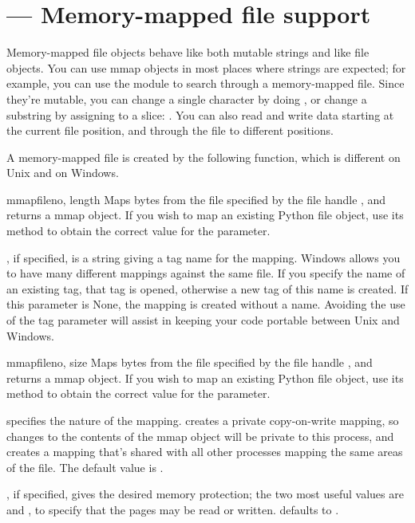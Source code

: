 \section{ ---
	Memory-mapped file support}


Memory-mapped file objects behave like both mutable strings and like
file objects.  You can use mmap objects in most places where strings
are expected; for example, you can use the  module to
search through a memory-mapped file.  Since they're mutable, you can
change a single character by doing , or
change a substring by assigning to a slice:
.  You can also read and write
data starting at the current file position, and 
through the file to different positions.

A memory-mapped file is created by the following function, which is
different on Unix and on Windows.

\begin{funcdesc}{mmap}{fileno, length}
  Maps  bytes from the file
specified by the file handle , and returns a mmap object.
If you wish to map an existing Python file object, use its
 method to obtain the correct value for the
 parameter.

, if specified, is a string giving a tag name for the mapping. 
Windows allows you to have many different mappings against the same
file.  If you specify the name of an existing tag, that tag is opened,
otherwise a new tag of this name is created.  If this parameter is
None, the mapping is created without a name.  Avoiding the use of the
tag parameter will assist in keeping your code portable between Unix
and Windows.
\end{funcdesc}

\begin{funcdesc}{mmap}{fileno, size}
  Maps  bytes from the file
specified by the file handle , and returns a mmap object.
If you wish to map an existing Python file object, use its
 method to obtain the correct value for the
 parameter.

 specifies the nature of the mapping.  
 creates a private copy-on-write mapping, so
changes to the contents of the mmap object will be private to this
process, and  creates a mapping that's shared
with all other processes mapping the same areas of the file.
The default value is .

, if specified, gives the desired memory protection; the two 
most useful values are  and ,
to specify that the pages may be read or written.
 defaults to .
\end{funcdesc}

